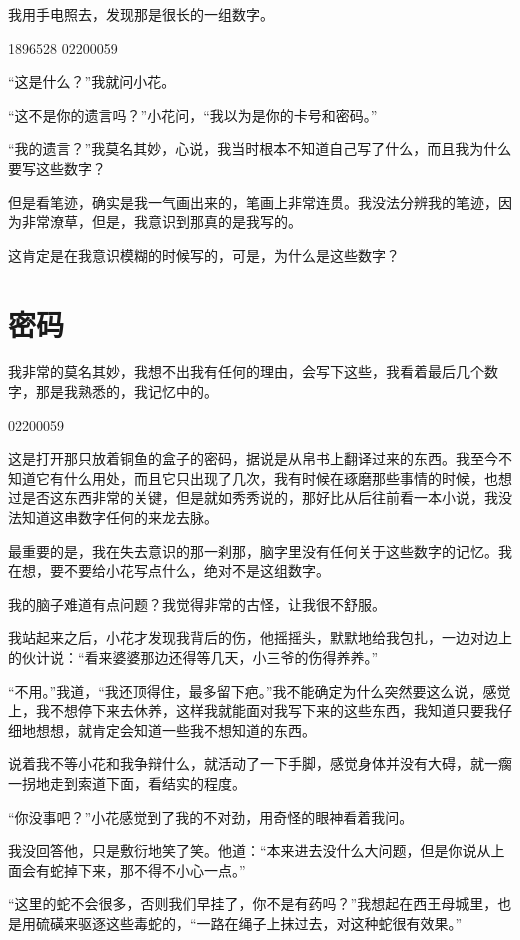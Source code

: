 我用手电照去，发现那是很长的一组数字。

1896528 02200059

“这是什么？”我就问小花。

“这不是你的遗言吗？”小花问，“我以为是你的卡号和密码。”

“我的遗言？”我莫名其妙，心说，我当时根本不知道自己写了什么，而且我为什么要写这些数字？

但是看笔迹，确实是我一气画出来的，笔画上非常连贯。我没法分辨我的笔迹，因为非常潦草，但是，我意识到那真的是我写的。

这肯定是在我意识模糊的时候写的，可是，为什么是这些数字？

\chapter{密码}

我非常的莫名其妙，我想不出我有任何的理由，会写下这些，我看着最后几个数字，那是我熟悉的，我记忆中的。

02200059

这是打开那只放着铜鱼的盒子的密码，据说是从帛书上翻译过来的东西。我至今不知道它有什么用处，而且它只出现了几次，我有时候在琢磨那些事情的时候，也想过是否这东西非常的关键，但是就如秀秀说的，那好比从后往前看一本小说，我没法知道这串数字任何的来龙去脉。

最重要的是，我在失去意识的那一刹那，脑字里没有任何关于这些数字的记忆。我在想，要不要给小花写点什么，绝对不是这组数字。

我的脑子难道有点问题？我觉得非常的古怪，让我很不舒服。

我站起来之后，小花才发现我背后的伤，他摇摇头，默默地给我包扎，一边对边上的伙计说：“看来婆婆那边还得等几天，小三爷的伤得养养。”

“不用。”我道，“我还顶得住，最多留下疤。”我不能确定为什么突然要这么说，感觉上，我不想停下来去休养，这样我就能面对我写下来的这些东西，我知道只要我仔细地想想，就肯定会知道一些我不想知道的东西。

说着我不等小花和我争辩什么，就活动了一下手脚，感觉身体并没有大碍，就一瘸一拐地走到索道下面，看结实的程度。

“你没事吧？”小花感觉到了我的不对劲，用奇怪的眼神看着我问。

我没回答他，只是敷衍地笑了笑。他道：“本来进去没什么大问题，但是你说从上面会有蛇掉下来，那不得不小心一点。”

“这里的蛇不会很多，否则我们早挂了，你不是有药吗？”我想起在西王母城里，也是用硫磺来驱逐这些毒蛇的，“一路在绳子上抹过去，对这种蛇很有效果。”

